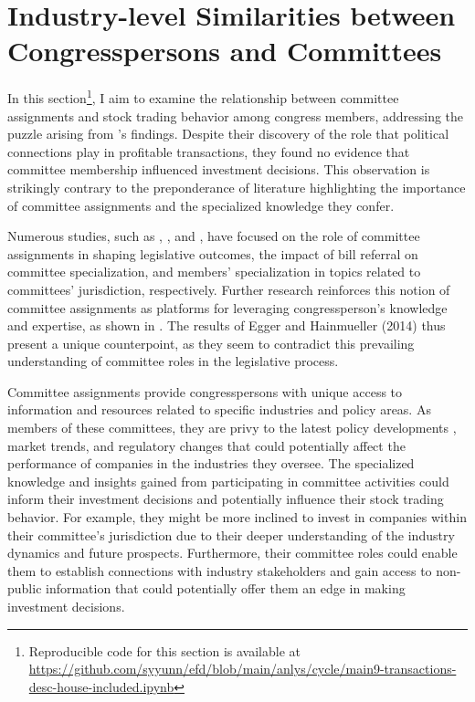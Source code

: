 \documentclass[15pt,letterpaper]{article}
\begin{document}
\section{Industry-level Similarities between Congresspersons and Committees}\label{sec:ce}

In this section\footnote{Reproducible code for this section is available at \url{https://github.com/syyunn/efd/blob/main/anlys/cycle/main9-transactions-desc-house-included.ipynb}}, I aim to examine the relationship between committee assignments and stock trading behavior among congress members, addressing the puzzle arising from \cite{eg14}'s findings. Despite their discovery of the role that political connections play in profitable transactions, they found no evidence that committee membership influenced investment decisions. This observation is strikingly contrary to the preponderance of literature highlighting the importance of committee assignments and the specialized knowledge they confer.

Numerous studies, such as \cite{patterson1970}, \cite{king1994}, and \cite{asher1974}, have focused on the role of committee assignments in shaping legislative outcomes, the impact of bill referral on committee specialization, and members' specialization in topics related to committees' jurisdiction, respectively. Further research reinforces this notion of committee assignments as platforms for leveraging congressperson's knowledge and expertise, as shown in \cite{10.2307/40709444, 10.2307/2111156, kiewiet1991logic, krehbiel1992information, curry2018knowledge}. The results of Egger and Hainmueller (2014) thus present a unique counterpoint, as they seem to contradict this prevailing understanding of committee roles in the legislative process.


Committee assignments provide congresspersons with unique access to information and resources related to specific industries and policy areas. As members of these committees, they are privy to the latest policy developments \citep{price1978policy}, market trends, and regulatory changes \citep{weiss1989congressional} that could potentially affect the performance of companies in the industries they oversee. The specialized knowledge and insights gained from participating in committee activities could inform their investment decisions and potentially influence their stock trading behavior. For example, they might be more inclined to invest in companies within their committee's jurisdiction due to their deeper understanding of the industry dynamics and future prospects. Furthermore, their committee roles could enable them to establish connections with industry stakeholders and gain access to non-public information that could potentially offer them an edge in making investment decisions.
\end{document}
